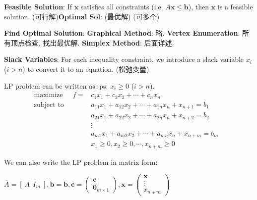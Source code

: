 \documentclass[9pt]{article}
\begin{document}
\vspace{-15pt}
\textbf{Feasible Solution}: If $\mathbf{x}$ satisfies all constraints (i.e. $A\mathbf{x}\leq\mathbf{b}$), then $\mathbf{x}$ is a feasible solution. {\footnotesize (可行解)}\quad \textbf{Optimal Sol}: {\footnotesize (最优解) (可多个)}

\textbf{Find Optimal Solution}: \textbf{Graphical Method}: {\footnotesize 略.} \quad \textbf{Vertex Enumeration}: {\footnotesize 所有顶点检查, 找出最优解.} \quad \textbf{Simplex Method}: {\footnotesize 后面详述.}

\textbf{Slack Variables}: For each inequality constraint, we introduce a slack variable $x_i$ ($i>n$) to convert it to an equation. {\footnotesize (松弛变量)}

\vspace{-9pt}
\begin{multicols}{2}

    LP problem can be written as: \quad \quad ps: $x_{i}\geq0$ ($i>n$).
    \[
    \begin{aligned}
        \text{maximize} \quad \ \ f = & c_1x_1 + c_2x_2 + \cdots + c_nx_n & \\
        \text{subject to} \quad \qquad & a_{11}x_1 + a_{12}x_2 + \cdots + a_{1n}x_n + x_{n+1} = b_1 & \\
                                & a_{21}x_1 + a_{22}x_2 + \cdots + a_{2n}x_n + x_{n+2} = b_2 & \\
                                & \vdots & \\
                                & a_{m1}x_1 + a_{m2}x_2 + \cdots + a_{mn}x_n + x_{n+m} = b_m & \\
                                & x_1 \geq 0, x_2 \geq 0, \cdots, x_{n+m} \geq 0 &
    \end{aligned}
    \]
    
    \columnbreak

    We can also write the LP problem in matrix form:

    \vspace{5pt}
    $
    \overline{A}= [ \ A  \ \ I_m \ ]
    ,\mathbf{b}=\mathbf{b}
    ,\overline{\mathbf{c}}=
    \begin{pmatrix}
        \mathbf{c} \\
        \mathbf{0}_{ m\times 1}
    \end{pmatrix}
    ,\mathbf{x}=
    \begin{pmatrix}
        \mathbf{x} \\
        \vdots \\
        x_{n+m}
    \end{pmatrix}
    $


\end{multicols}
\end{document}
